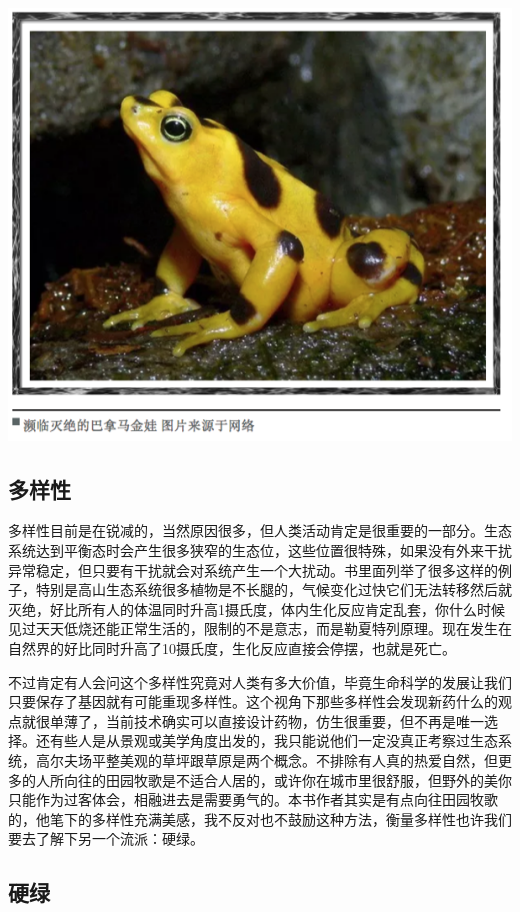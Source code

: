 \documentclass[]{book}
\begin{document}
\includegraphics[width=8.33in]{images/miejue5}

\subsection{多样性}

多样性目前是在锐减的，当然原因很多，但人类活动肯定是很重要的一部分。生态系统达到平衡态时会产生很多狭窄的生态位，这些位置很特殊，如果没有外来干扰异常稳定，但只要有干扰就会对系统产生一个大扰动。书里面列举了很多这样的例子，特别是高山生态系统很多植物是不长腿的，气候变化过快它们无法转移然后就灭绝，好比所有人的体温同时升高1摄氏度，体内生化反应肯定乱套，你什么时候见过天天低烧还能正常生活的，限制的不是意志，而是勒夏特列原理。现在发生在自然界的好比同时升高了10摄氏度，生化反应直接会停摆，也就是死亡。

不过肯定有人会问这个多样性究竟对人类有多大价值，毕竟生命科学的发展让我们只要保存了基因就有可能重现多样性。这个视角下那些多样性会发现新药什么的观点就很单薄了，当前技术确实可以直接设计药物，仿生很重要，但不再是唯一选择。还有些人是从景观或美学角度出发的，我只能说他们一定没真正考察过生态系统，高尔夫场平整美观的草坪跟草原是两个概念。不排除有人真的热爱自然，但更多的人所向往的田园牧歌是不适合人居的，或许你在城市里很舒服，但野外的美你只能作为过客体会，相融进去是需要勇气的。本书作者其实是有点向往田园牧歌的，他笔下的多样性充满美感，我不反对也不鼓励这种方法，衡量多样性也许我们要去了解下另一个流派：硬绿。

\subsection{硬绿}
\end{document}
